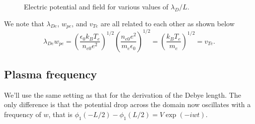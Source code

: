 \documentclass[a4paper,11pt]{report}
\begin{document}
\begin{figure}
\begin{subfigure}[b]{0.45\textwidth}
        \caption{}
        \label{fig:debye_elec}
    \end{subfigure}
    \caption{Electric potential and field for various values of $\lambda_D/L$.}
    \label{fig:debye_phi_elec}
\end{figure}

We note that $\lambda_{De}$,  $w_{pe}$, and $v_{Te}$ are all related to each other as shown below
\begin{equation}
    \label{eq:debye_3vars}
    \lambda_{De} w_{pe} = \left ( \frac{\epsilon_0 k_B T_e}{n_{e0} e^2} \right )^{1/2} \left ( \frac{n_{e0} e^2}{m_e \epsilon_0} \right )^{1/2} = \left ( \frac{k_B T_e}{m_e} \right )^{1/2} = v_{Te}.
\end{equation}

\subsection{Plasma frequency}
We'll use the same setting as that for the derivation of the Debye length. The only difference is that the potential drop across the domain now oscillates with a frequency of $w$, that is $\phi_1(-L/2) - \phi_1(L/2) = V \exp (-iwt)$.
\end{document}
